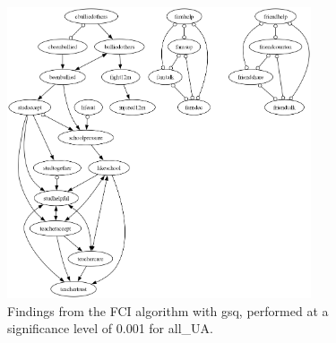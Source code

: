 \begin{figure}[htbp]
    \centering
    \includegraphics[width=0.8\textwidth]{Report/final_report/pictures/FCI_gsq_0.001_all_UA.png}
    \caption{Findings from the FCI algorithm with gsq, performed at a significance level of 0.001 for all_UA.}
    \label{fig:fci_gsq_0.001all_UA}
\end{figure}
